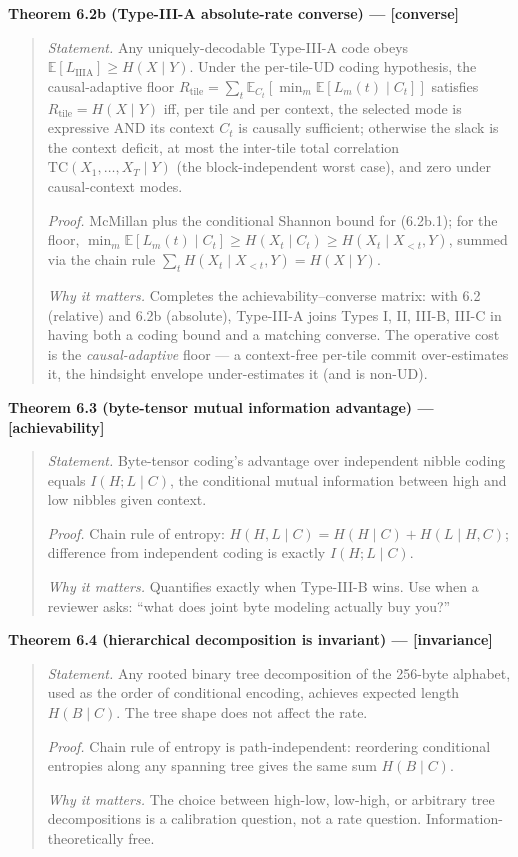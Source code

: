 \documentclass[
]{article}
\begin{document}
\textbf{Theorem 6.2b (Type-III-A absolute-rate converse) ---
{[}converse{]}}

\begin{quote}
\emph{Statement.} Any uniquely-decodable Type-III-A code obeys
$\mathbb{E}[L_{\mathrm{IIIA}}] \geq H(X \mid Y)$. Under the per-tile-UD
coding hypothesis, the causal-adaptive floor
$R_{\mathrm{tile}} = \sum_t \mathbb{E}_{C_t}[\min_m
\mathbb{E}[L_m(t) \mid C_t]]$ satisfies $R_{\mathrm{tile}} =
H(X \mid Y)$ iff, per tile and per context, the selected mode is
expressive AND its context $C_t$ is causally sufficient; otherwise the
slack is the context deficit, at most the inter-tile total correlation
$\mathrm{TC}(X_1,\ldots,X_T \mid Y)$ (the block-independent worst case),
and zero under causal-context modes.

\emph{Proof.} McMillan plus the conditional Shannon bound for (6.2b.1);
for the floor, $\min_m \mathbb{E}[L_m(t) \mid C_t] \geq H(X_t \mid C_t)
\geq H(X_t \mid X_{<t}, Y)$, summed via the chain rule
$\sum_t H(X_t \mid X_{<t}, Y) = H(X \mid Y)$.

\emph{Why it matters.} Completes the achievability--converse matrix:
with 6.2 (relative) and 6.2b (absolute), Type-III-A joins Types I, II,
III-B, III-C in having both a coding bound and a matching converse. The
operative cost is the \emph{causal-adaptive} floor --- a context-free
per-tile commit over-estimates it, the hindsight envelope under-estimates
it (and is non-UD).
\end{quote}

\textbf{Theorem 6.3 (byte-tensor mutual information advantage) ---
{[}achievability{]}}

\begin{quote}
\emph{Statement.} Byte-tensor coding's advantage over independent
nibble coding equals $I(H ; L \mid C)$, the conditional mutual
information between high and low nibbles given context.

\emph{Proof.} Chain rule of entropy:
$H(H, L \mid C) = H(H \mid C) + H(L \mid H, C)$; difference from
independent coding is exactly $I(H ; L \mid C)$.

\emph{Why it matters.} Quantifies exactly when Type-III-B wins. Use
when a reviewer asks: ``what does joint byte modeling actually buy
you?''
\end{quote}

\textbf{Theorem 6.4 (hierarchical decomposition is invariant) ---
{[}invariance{]}}

\begin{quote}
\emph{Statement.} Any rooted binary tree decomposition of the
256-byte alphabet, used as the order of conditional encoding,
achieves expected length $H(B \mid C)$. The tree shape does not
affect the rate.

\emph{Proof.} Chain rule of entropy is path-independent: reordering
conditional entropies along any spanning tree gives the same sum
$H(B \mid C)$.

\emph{Why it matters.} The choice between high-low, low-high, or
arbitrary tree decompositions is a calibration question, not a rate
question. Information-theoretically free.
\end{quote}
\end{document}
